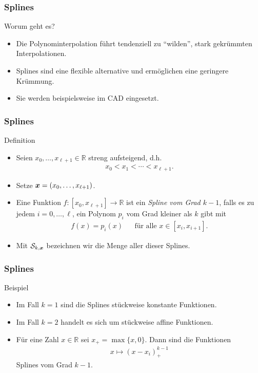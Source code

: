\documentclass{beamer}
\title[Annuma]{\mytitle}
\author[Amin Coja-Oghlan]{Amin Coja-Oghlan}
\institute[Frankfurt]{JWGUFFM}
\date{}
\def\vec#1{\mathchoice{\mbox{\boldmath$\displaystyle#1$}}
{\mbox{\boldmath$\textstyle#1$}}
{\mbox{\boldmath$\scriptstyle#1$}}
{\mbox{\boldmath$\scriptscriptstyle#1$}}}
\renewcommand{\emph}[1]{{\textcolor{solarizedRed}{\itshape #1}}}
\newcommand\cS{\mathcal S}
\newcommand\vx{\vec x}
\newcommand\RR{\mathbb R}
\renewcommand{\oe}{\"o}
\newcommand{\ue}{\"u}
\newcommand{\mytitle}{Splines}
\begin{document}
\frame[plain]{\titlepage}

\begin{frame}\frametitle{\mytitle}
	\begin{block}{Worum geht es?}
		\begin{itemize}
			\item Die Polynominterpolation f\ue hrt tendenziell zu ``wilden'', stark gekr\ue mmten Interpolationen.
			\item Splines sind eine flexible alternative und erm\oe glichen eine geringere Kr\ue mmung.
			\item Sie werden beispielsweise im CAD eingesetzt.
		\end{itemize}
	\end{block}
\end{frame}

\begin{frame}\frametitle{\mytitle}
	\begin{block}{Definition}
		\begin{itemize}
			\item Seien $x_0,\ldots,x_{\ell+1}\in\RR$ streng aufsteigend, d.h.\
				\begin{align*}
					x_0<x_1<\cdots<x_{\ell+1}.
				\end{align*}
			\item Setze $\vx=(x_0,\ldots,x_{\ell+1})$.
			\item  Eine Funktion $f:[x_0,x_{\ell+1}]\to\RR$ ist ein \emph{Spline vom Grad $k-1$}, falls es zu jedem $i=0,\ldots,\ell$, ein Polynom $p_i$ vom Grad kleiner als $k$ gibt mit
				\begin{align*}
					f(x)=p_i(x)&&\mbox{f\ue r alle }x\in[x_i,x_{i+1}].
				\end{align*}
			\item Mit $\cS_{k,\vx}$ bezeichnen wir die Menge aller dieser Splines.
		\end{itemize}
	\end{block}
\end{frame}

\begin{frame}\frametitle{\mytitle}
	\begin{block}{Beispiel}
		\begin{itemize}
			\item Im Fall $k=1$ sind die Splines st\ue ckweise konstante Funktionen.
			\item Im Fall $k=2$ handelt es sich um st\ue ckweise affine Funktionen.
			\item F\ue r eine Zahl $x\in\RR$ sei
					$x_+=\max\{x,0\}.$
				Dann sind die Funktionen
				\begin{align*}
					x\mapsto(x-x_i)^{k-1}_+
				\end{align*}
				Splines vom Grad $k-1$.
		\end{itemize}
	\end{block}
\end{frame}
\end{document}
